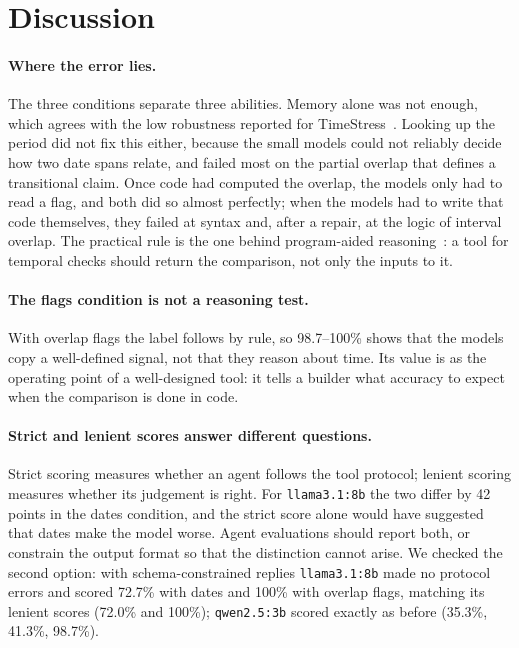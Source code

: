 \documentclass[11pt,a4paper]{article}
\newcommand{\code}[1]{\texttt{#1}}
\begin{document}
\section{Discussion}

\paragraph{Where the error lies.} The three conditions separate three abilities. Memory alone was not enough, which
agrees with the low robustness reported for TimeStress~\cite{khodja2025timestress}. Looking up the period did not fix
this either, because the small models could not reliably decide how two date spans relate, and failed most on the
partial overlap that defines a transitional claim. Once code had computed the overlap, the models only had to read a
flag, and both did so almost perfectly; when the models had to write that code themselves, they failed at syntax and,
after a repair, at the logic of interval overlap. The practical rule is the one behind program-aided
reasoning~\cite{gao2023pal}: a tool for temporal checks should return the comparison, not only the inputs to it.

\paragraph{The flags condition is not a reasoning test.} With overlap flags the label follows by rule, so 98.7--100\%
shows that the models copy a well-defined signal, not that they reason about time. Its value is as the operating
point of a well-designed tool: it tells a builder what accuracy to expect when the comparison is done in code.

\paragraph{Strict and lenient scores answer different questions.} Strict scoring measures whether an agent follows
the tool protocol; lenient scoring measures whether its judgement is right. For \code{llama3.1:8b} the two differ by
42 points in the dates condition, and the strict score alone would have suggested that dates make the model worse.
Agent evaluations should report both, or constrain the output format so that the distinction cannot arise. We
checked the second option: with schema-constrained replies \code{llama3.1:8b} made no protocol errors and scored
72.7\% with dates and 100\% with overlap flags, matching its lenient scores (72.0\% and 100\%); \code{qwen2.5:3b}
scored exactly as before (35.3\%, 41.3\%, 98.7\%).
\end{document}
